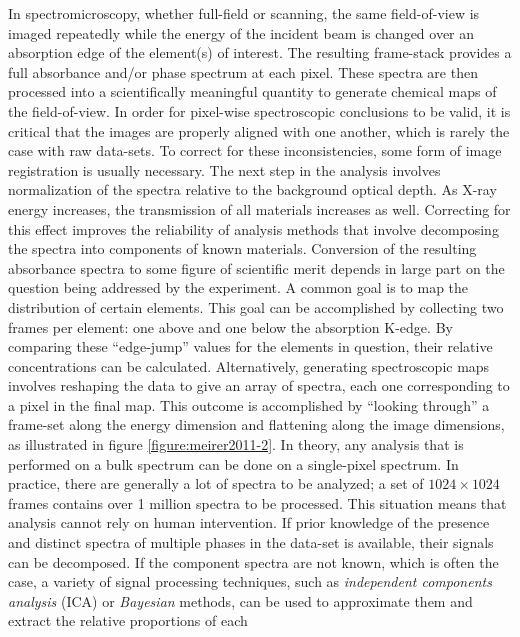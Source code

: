 \documentclass[journal=cmatex,manuscript=perspective]{achemso}
\begin{document}
In spectromicroscopy, whether full-field or scanning, the same
field-of-view is imaged repeatedly while the energy of the incident
beam is changed over an absorption edge of the element(s) of
interest. The resulting frame-stack provides a full
absorbance and/or phase spectrum at each pixel. These spectra are then
processed into a scientifically meaningful quantity to generate
chemical maps of the field-of-view. In order for pixel-wise
spectroscopic conclusions to be valid, it is critical that the images
are properly aligned with one another, which is rarely the case with
raw data-sets. To correct for these inconsistencies, some form of image
registration is usually necessary. The next step in the analysis
involves normalization of the spectra relative to the background
optical depth. As X-ray energy increases, the transmission of all
materials increases as well. Correcting for this effect improves the
reliability of analysis methods that involve decomposing the spectra
into components of known materials\cite{jin2015}. Conversion of the
resulting absorbance spectra to some figure of scientific merit
depends in large part on the question being addressed by the
experiment. A common goal is to map the distribution of certain
elements. This goal can be accomplished by collecting two frames per
element: one above and one below the absorption K-edge. By comparing
these ``edge-jump'' values for the elements in question, their
relative concentrations can be
calculated\cite{shieh2006}. Alternatively, generating spectroscopic
maps involves reshaping the data to give an array of spectra, each one
corresponding to a pixel in the final map. This outcome is
accomplished by ``looking through'' a frame-set along the energy
dimension and flattening along the image dimensions, as illustrated in
figure \ref{figure:meirer2011-2}. In theory, any analysis that is
performed on a bulk spectrum can be done on a single-pixel
spectrum. In practice, there are generally a lot of spectra to be
analyzed; a set of $1024\times1024$ frames contains over 1 million
spectra to be processed. This situation means that analysis cannot
rely on human intervention. If prior knowledge of the presence and
distinct spectra of multiple phases in the data-set is available, their
signals can be decomposed\cite{wang2016,yu2015-2,shapiro2014}. If the
component spectra are not known, which is often the case, a variety of
signal processing techniques, such as \emph{independent components
  analysis} (ICA)\cite{shlens2014} or \emph{Bayesian}
  methods\cite{knuth2005}, can be used to approximate them and
extract the relative proportions of each
\end{document}
